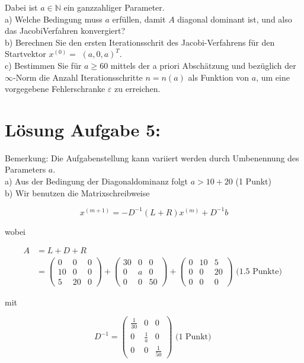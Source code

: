 \documentclass[10pt]{article}
\begin{document}
Dabei ist $a \in \mathbb{N}$ ein ganzzahliger Parameter.\\
a) Welche Bedingung muss $a$ erfüllen, damit $A$ diagonal dominant ist, und also das JacobiVerfahren konvergiert?\\
b) Berechnen Sie den ersten Iterationsschrit des Jacobi-Verfahrens für den Startvektor $x^{(0)}=$ $(a, 0, a)^{T}$.\\
c) Bestimmen Sie für $a \geq 60$ mittels der a priori Abschätzung und bezüglich der $\infty$-Norm die Anzahl Iterationsschritte $n=n(a)$ als Funktion von $a$, um eine vorgegebene Fehlerschranke $\varepsilon$ zu erreichen.

\section*{Lösung Aufgabe 5:}
Bemerkung: Die Aufgabenstellung kann variiert werden durch Umbenennung des Parameters $a$.\\
a) Aus der Bedingung der Diagonaldominanz folgt $a>10+20$ (1 Punkt)\\
b) Wir benutzen die Matrixschreibweise

$$
x^{(m+1)}=-D^{-1}(L+R) x^{(m)}+D^{-1} b
$$

wobei

$$
\begin{aligned}
A & =L+D+R \\
& =\left(\begin{array}{ccc}
0 & 0 & 0 \\
10 & 0 & 0 \\
5 & 20 & 0
\end{array}\right)+\left(\begin{array}{ccc}
30 & 0 & 0 \\
0 & a & 0 \\
0 & 0 & 50
\end{array}\right)+\left(\begin{array}{ccc}
0 & 10 & 5 \\
0 & 0 & 20 \\
0 & 0 & 0
\end{array}\right) \text { (1.5 Punkte) }
\end{aligned}
$$

mit

$$
D^{-1}=\left(\begin{array}{ccc}
\frac{1}{30} & 0 & 0 \\
0 & \frac{1}{a} & 0 \\
0 & 0 & \frac{1}{50}
\end{array}\right) \text { (1 Punkt) }
$$
\end{document}
